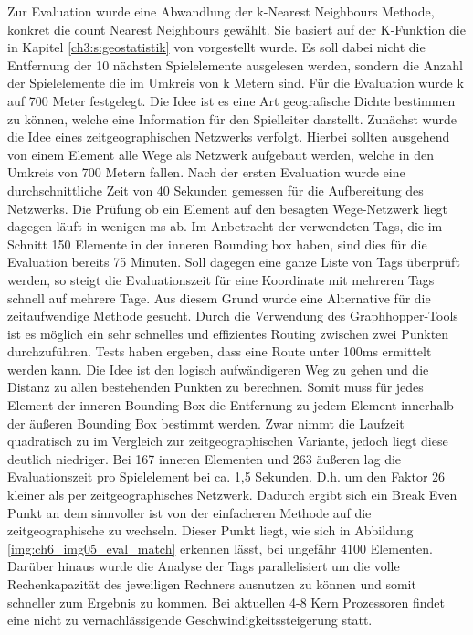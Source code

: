 Zur Evaluation wurde eine Abwandlung der k-Nearest Neighbours Methode, konkret die count Nearest Neighbours gewählt.
Sie basiert auf der K-Funktion die in Kapitel \ref{ch3:s:geostatistik} von \textcite{Spooner.2004} vorgestellt wurde.
Es soll dabei nicht die Entfernung der 10 nächsten Spielelemente ausgelesen werden, sondern die Anzahl der Spielelemente die im  Umkreis von k Metern sind. Für die Evaluation wurde k auf 700 Meter festgelegt. Die Idee ist es eine Art geografische Dichte bestimmen zu können, welche eine Information für den Spielleiter darstellt.
Zunächst wurde die Idee eines zeitgeographischen Netzwerks verfolgt. Hierbei sollten ausgehend von einem Element alle Wege als Netzwerk aufgebaut werden, welche in den Umkreis von 700 Metern fallen. Nach der ersten Evaluation wurde eine durchschnittliche Zeit von 40 Sekunden gemessen für die Aufbereitung des Netzwerks. Die Prüfung ob ein Element auf den besagten Wege-Netzwerk liegt dagegen läuft in wenigen ms ab.
Im Anbetracht der verwendeten Tags, die im Schnitt 150 Elemente in der inneren Bounding box haben, sind dies für die Evaluation bereits 75 Minuten.
Soll dagegen eine ganze Liste von Tags überprüft werden, so steigt die Evaluationszeit für eine Koordinate mit mehreren Tags schnell auf mehrere Tage.
Aus diesem Grund wurde eine Alternative für die zeitaufwendige Methode gesucht.
Durch die Verwendung des Graphhopper-Tools ist es möglich ein sehr schnelles und effizientes Routing zwischen zwei Punkten durchzuführen.
Tests haben ergeben, dass eine Route unter 100ms ermittelt werden kann. Die Idee ist den logisch aufwändigeren Weg zu gehen und die Distanz zu allen bestehenden Punkten zu berechnen. Somit muss für jedes Element der inneren Bounding Box die Entfernung zu jedem Element innerhalb der äußeren Bounding Box bestimmt werden. Zwar nimmt die Laufzeit quadratisch zu im Vergleich zur zeitgeographischen Variante, jedoch liegt diese deutlich niedriger. Bei 167 inneren Elementen und 263 äußeren lag die Evaluationszeit pro Spielelement bei ca. 1,5 Sekunden. D.h. um den Faktor 26 kleiner als per zeitgeographisches Netzwerk. Dadurch ergibt sich ein Break Even Punkt an dem sinnvoller ist von der einfacheren Methode auf die zeitgeographische zu wechseln.
Dieser Punkt liegt, wie sich in Abbildung \ref{img:ch6_img05_eval_match} erkennen lässt, bei ungefähr 4100 Elementen.
Darüber hinaus wurde die Analyse der Tags parallelisiert um die volle Rechenkapazität des jeweiligen Rechners ausnutzen zu können und somit schneller zum Ergebnis zu kommen. Bei aktuellen 4-8 Kern Prozessoren findet eine nicht zu vernachlässigende Geschwindigkeitssteigerung statt.

